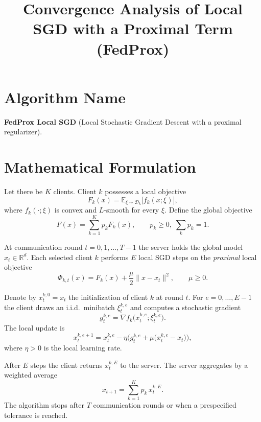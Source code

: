 \documentclass[11pt]{article}
\begin{document}
\title{Convergence Analysis of Local SGD with a Proximal Term (FedProx)}
\author{}
\date{}
\maketitle

\tableofcontents
\newpage

\section*{Algorithm Name}
\textbf{FedProx Local SGD} (Local Stochastic Gradient Descent with a proximal regularizer).

\section*{Mathematical Formulation}
Let there be $K$ clients.  Client $k$ possesses a local objective
\[
F_k(x)=\mathbb{E}_{\xi\sim\mathcal{D}_k}\big[f_k(x;\xi)\big],
\]
where $f_k(\cdot;\xi)$ is convex and $L$-smooth for every $\xi$.
Define the global objective
\[
F(x)=\sum_{k=1}^{K}p_kF_k(x),\qquad p_k\ge 0,\;\sum_{k}p_k=1 .
\]

At communication round $t=0,1,\dots,T-1$ the server holds the
global model $x_t\in\mathbb{R}^d$.  Each selected client $k$ performs
$E$ local SGD steps on the \emph{proximal} local objective
\[
\Phi_{k,t}(x)=F_k(x)+\frac{\mu}{2}\|x-x_t\|^2,
\qquad \mu\ge 0 .
\]

Denote by $x_{t}^{k,0}=x_t$ the initialization of client $k$ at round $t$.
For $e=0,\dots,E-1$ the client draws an i.i.d.\ minibatch
$\xi_{t}^{k,e}$ and computes a stochastic gradient
\[
g_{t}^{k,e}= \nabla f_k\big(x_{t}^{k,e};\xi_{t}^{k,e}\big).
\]
The local update is
\begin{equation}
\label{eq:local-update}
x_{t}^{k,e+1}=x_{t}^{k,e}
-\eta\Big(g_{t}^{k,e}+ \mu\big(x_{t}^{k,e}-x_t\big)\Big),
\end{equation}
where $\eta>0$ is the local learning rate.

After $E$ steps the client returns $x_{t}^{k,E}$ to the server.
The server aggregates by a weighted average
\begin{equation}
\label{eq:global-agg}
x_{t+1}= \sum_{k=1}^{K}p_k\,x_{t}^{k,E}.
\end{equation}
The algorithm stops after $T$ communication rounds or when a
prespecified tolerance is reached.
\end{document}
